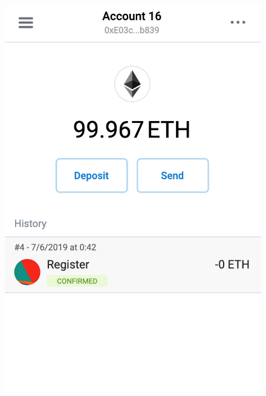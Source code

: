 	\begin{figure}
		\centering
		\includegraphics[width=\linewidth/3]{img/screen_metamask4.png}

\end{figure}
